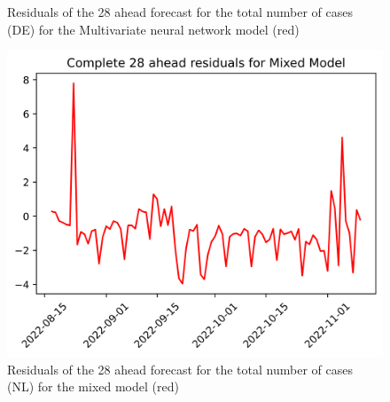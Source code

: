 \begin{figure}
\begin{minipage}{.32\textwidth}
  \caption{Residuals of the 28 ahead forecast for the total number of cases (DE) for the Multivariate neural network model (red)}
  \label{fig:tot_cases_error_28_mvnn_DE}
\end{minipage}
\begin{minipage}{.32\textwidth}
  \centering
  \includegraphics[width=\linewidth]{pics/28_ah/28_ahead_errors_Mixed Model.png}
  \caption{Residuals of the 28 ahead forecast for the total number of cases (NL) for the mixed model (red)}
  \label{fig:tot_cases_error_28_mix}
\end{minipage}

\end{figure}
